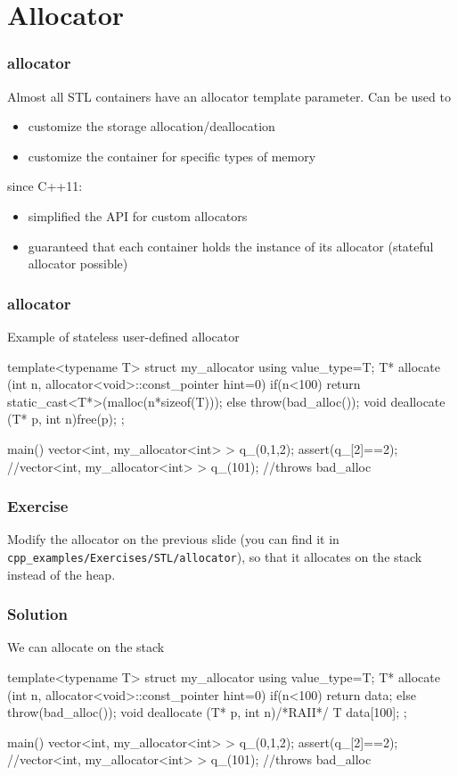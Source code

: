 \documentclass[aspectratio=43]{beamer}
\begin{document}
\section{Allocator}

\begin{frame}[fragile]\frametitle{allocator}
  Almost all STL containers have an allocator template parameter.
  Can be used to
  \begin{itemize}
    \item customize the storage allocation/deallocation
    \item customize the container for specific types of memory
  \end{itemize}
  since C++11:
  \begin{itemize}
  \item simplified the API for custom allocators
  \item guaranteed that each container holds the instance of its allocator (\alert{stateful allocator possible})
  \end{itemize}
\end{frame}


\begin{frame}[fragile]\frametitle{allocator}
  Example of stateless user-defined allocator
  \begin{Cpplisting}{}
template<typename T>
struct my_allocator{
  using value_type=T;
  T* allocate (int n, allocator<void>::const_pointer hint=0){
    if(n<100)
      return static_cast<T*>(malloc(n*sizeof(T)));
    else throw(bad_alloc());
  }
  void deallocate (T* p, int n){free(p);}
};

main(){
  vector<int,  my_allocator<int> > q_({0,1,2});
  assert(q_[2]==2);
  //vector<int,  my_allocator<int> > q_(101); //throws bad_alloc
}
  \end{Cpplisting}
\end{frame}

\begin{frame}[fragile]\frametitle{Exercise}
  Modify the allocator on the previous slide
  (you can find it in \verb~cpp_examples/Exercises/STL/allocator~), so that it allocates on the
  stack instead of the heap.

\end{frame}


\begin{frame}[fragile]\frametitle{Solution}
  We can allocate on the stack
  \begin{Cpplisting}{}
template<typename T>
struct my_allocator{
  using value_type=T;
  T* allocate (int n, allocator<void>::const_pointer hint=0){
    if(n<100)
      return data; else throw(bad_alloc());
  }
  void deallocate (T* p, int n){/*RAII*/}
  T data[100];
};

main(){
  vector<int,  my_allocator<int> > q_({0,1,2});
  assert(q_[2]==2);
  //vector<int,  my_allocator<int> > q_(101); //throws bad_alloc
}
  \end{Cpplisting}
\end{frame}
\end{document}
